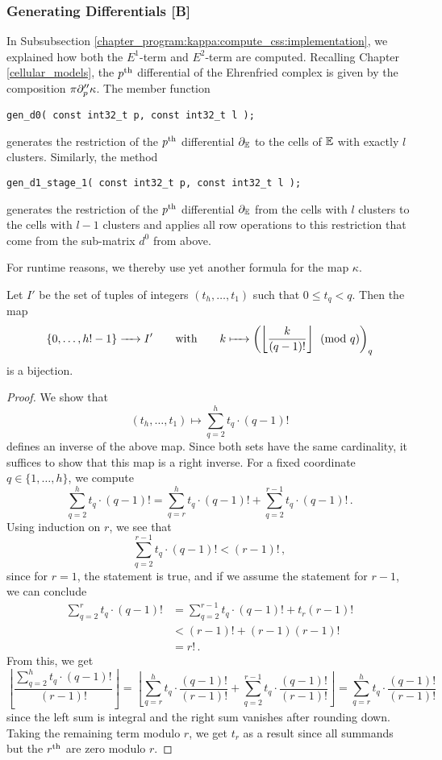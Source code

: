 \subsubsection{Generating Differentials [B]}
\label{chapter_program:kappa:css:gen_diff}

In Subsubsection \ref{chapter_program:kappa:compute_css:implementation}, we explained how both the $E^1$-term and $E^2$-term are computed.
Recalling Chapter \ref{cellular_models}, the $p^{\text{th}}$ differential of the Ehrenfried complex is given by the composition $\pi \partial''_p \kappa$.
The member function
\begin{lstlisting}
gen_d0( const int32_t p, const int32_t l );
\end{lstlisting}
generates the restriction of the $p^{\text{th}}$ differential $\partial_\mathbb E$ to the cells of $\mathbb E$ with exactly $l$ clusters.
Similarly, the method
\begin{lstlisting}
gen_d1_stage_1( const int32_t p, const int32_t l );
\end{lstlisting}
generates the restriction of the $p^{\text{th}}$ differential $\partial_\mathbb E$ from the cells with $l$ clusters to the cells with $l-1$ clusters and
applies all row operations to this restriction that come from the sub-matrix $d^0$ from above.

For runtime reasons, we thereby use yet another formula for the map $\kappa$.
\begin{prop}
    Let $I'$ be the set of tuples of integers $(t_h, \ldots, t_1)$ such that $0 \leq t_q < q$.
    Then the map
    \[
        \{ 0, \ldots, h! - 1\} \to I'
        \mspc{with}{20}
        k \mapsto \left( \left\lfloor \frac{k}{(q-1)!} \right\rfloor \pmod q\right)_q
    \]
    is a bijection.
\end{prop}
\begin{proof}
We show that
\[
    (t_h, \ldots, t_1) \mapsto \sum_{q=2}^h t_q \cdot (q-1)!
\]
defines an inverse of the above map. 
Since both sets have the same cardinality, 
it suffices to show that this map is a right inverse.
For a fixed coordinate $q \in \{1, \dotsc, h\}$, we compute
\[
    \sum_{q=2}^h t_q \cdot (q-1)! = \sum_{q=r}^h t_q \cdot (q-1)! + \sum_{q=2}^{r-1} t_q \cdot (q-1)!\,.
\]
Using induction on $r$, we see that
\[
    \sum_{q=2}^{r-1} t_q \cdot (q-1)! < (r-1)!\,,
\]
since for $r = 1$, the statement is true, and if we assume the statement for $r-1$, we can conclude
\begin{align*}
    \sum_{q=2}^{r} t_q \cdot (q-1)! &= \sum_{q=2}^{r-1} t_q \cdot (q-1)! + t_r (r-1)! \\
                                    &< (r-1)!               + (r-1) (r-1)! \\
                                    &= r!\,.
\end{align*}
From this, we get
\[
    \left\lfloor \frac{\sum_{q=2}^h t_q \cdot (q-1)!}{(r-1)!} \right\rfloor=\left\lfloor \sum_{q=r}^h t_q \cdot \frac{(q-1)!}{(r-1)!} + \sum_{q=2}^{r-1} t_q \cdot \frac{(q-1)!}{(r-1)!} \right\rfloor = \sum_{q=r}^h t_q \cdot \frac{(q-1)!}{(r-1)!}
\]
since the left sum is integral and the right sum vanishes after rounding down.
Taking the remaining term modulo $r$, we get $t_r$ as a result since all summands but the $r^{\text{th}}$ are zero modulo $r$.
\end{proof}


